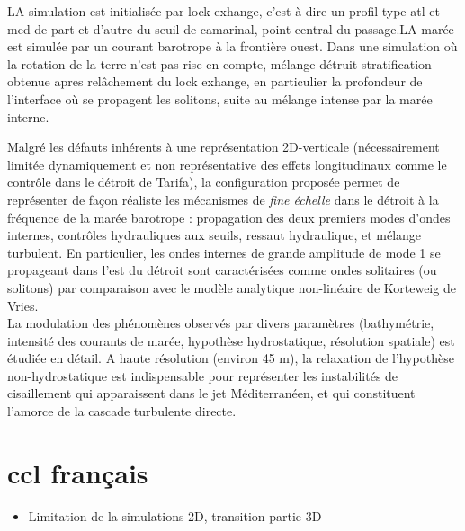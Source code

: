 \documentclass[a4paper,12pt,notitlepage]{report}
\numberwithin{equation}{section}
\begin{document}
LA simulation est initialisée par lock exhange, c'est à dire un profil type atl et med de part et d'autre du seuil de camarinal, point central du passage.LA marée est simulée par un courant barotrope à la frontière ouest. Dans une simulation où la rotation de la terre n'est pas rise en compte, mélange détruit stratification obtenue apres relâchement du lock exhange, en particulier la profondeur de l'interface où se propagent les solitons, suite au mélange intense par la marée interne.


Malgré les défauts inhérents à une représentation 2D-verticale (nécessairement limitée dynamiquement et non représentative des effets longitudinaux comme le contrôle dans le détroit de Tarifa), la configuration proposée permet de représenter de façon réaliste les mécanismes de \textit{fine échelle} dans le détroit à la fréquence de la marée barotrope : propagation des deux premiers modes d'ondes internes, contrôles hydrauliques aux seuils, ressaut hydraulique, et mélange turbulent. En particulier, les ondes internes de grande amplitude de mode 1 se propageant dans l'est du détroit sont caractérisées comme ondes solitaires (ou solitons) par comparaison avec le modèle analytique non-linéaire de Korteweig de Vries.\\

La modulation des phénomènes observés par divers paramètres (bathymétrie, intensité des courants de marée, hypothèse hydrostatique, résolution spatiale) est étudiée en détail. A haute résolution (environ 45 m), la relaxation de l'hypothèse non-hydrostatique est indispensable pour représenter les instabilités de cisaillement qui apparaissent dans le jet Méditerranéen, et qui constituent l'amorce de la cascade turbulente directe.



%
\addtocounter{section}{1}
%



\section{ccl français}
\begin{itemize}
\item Limitation de la simulations 2D, transition partie 3D
\end{itemize}
\end{document}
